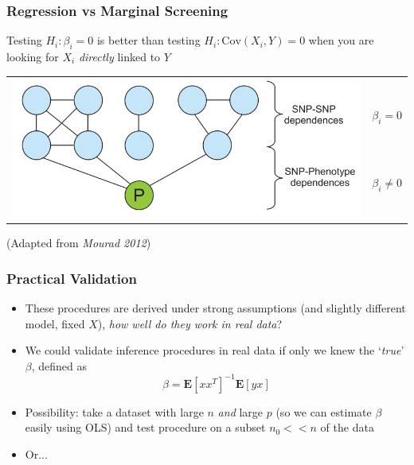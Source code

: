 \documentclass{beamer}
\newcommand{\E}{\textbf{E}}
\newcommand{\Cov}{\text{Cov}}
\begin{document}
\begin{frame}
\frametitle{Regression vs Marginal Screening}
Testing $H_i: \beta_i = 0$ is better than testing $H_i: \Cov(X_i, Y) = 0$
when you are looking for $X_i$ \emph{directly} linked to $Y$
\begin{center}
\begin{tabular}{cc}
\multirow{5}{*}{\includegraphics[scale = 0.3]{pgm.png}} & \\
& $\beta_i = 0$\\
& \vspace{0.2in}\\
& $\beta_i \neq 0$\\
& \vspace{0.2in}\\
\end{tabular}
\end{center}
(Adapted from \emph{Mourad 2012})
\end{frame}

\begin{frame}
\frametitle{Practical Validation}
\begin{itemize}
\item These procedures are derived under strong assumptions (and slightly different model, fixed $X$), \emph{how well do they work in real data}?
\item We could validate inference procedures in real data if only we knew the `\emph{true}' $\beta$, defined as
\[
\beta = \E[x x^T]^{-1} \E[yx]
\]
\item Possibility: take a dataset with large $n$ \emph{and} large $p$ (so we can estimate $\beta$ easily using OLS) and test procedure on a subset $n_0 << n$ of the data
\item Or...
\end{itemize}
\end{frame}
\end{document}
